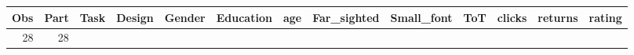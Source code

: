 \documentclass[]{svmono}
\theoremstyle{definition}
\theoremstyle{definition}
\theoremstyle{definition}
\theoremstyle{remark}
\begin{document}
\begin{longtable}[]{@{}rrllllrllrrrr@{}}
\toprule
\begin{minipage}[b]{0.03\columnwidth}\raggedleft\strut
Obs\strut
\end{minipage} & \begin{minipage}[b]{0.04\columnwidth}\raggedleft\strut
Part\strut
\end{minipage} & \begin{minipage}[b]{0.04\columnwidth}\raggedright\strut
Task\strut
\end{minipage} & \begin{minipage}[b]{0.05\columnwidth}\raggedright\strut
Design\strut
\end{minipage} & \begin{minipage}[b]{0.05\columnwidth}\raggedright\strut
Gender\strut
\end{minipage} & \begin{minipage}[b]{0.07\columnwidth}\raggedright\strut
Education\strut
\end{minipage} & \begin{minipage}[b]{0.03\columnwidth}\raggedleft\strut
age\strut
\end{minipage} & \begin{minipage}[b]{0.08\columnwidth}\raggedright\strut
Far\_sighted\strut
\end{minipage} & \begin{minipage}[b]{0.08\columnwidth}\raggedright\strut
Small\_font\strut
\end{minipage} & \begin{minipage}[b]{0.03\columnwidth}\raggedleft\strut
ToT\strut
\end{minipage} & \begin{minipage}[b]{0.05\columnwidth}\raggedleft\strut
clicks\strut
\end{minipage} & \begin{minipage}[b]{0.06\columnwidth}\raggedleft\strut
returns\strut
\end{minipage} & \begin{minipage}[b]{0.05\columnwidth}\raggedleft\strut
rating\strut
\end{minipage}\tabularnewline
\midrule
\endhead
\begin{minipage}[t]{0.03\columnwidth}\raggedleft\strut
28\strut
\end{minipage} & \begin{minipage}[t]{0.04\columnwidth}\raggedleft\strut
28\strut
\end{minipage} & \begin{minipage}[t]{0.04\columnwidth}\raggedright\strut

\end{minipage}
\end{longtable}
\end{document}
